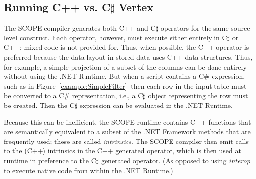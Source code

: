 \subsection{Running C++ vs. C$\sharp$ Vertex}
The SCOPE compiler generates both C++ and C$\sharp$ operators for the same source-level construct.
Each operator, however, must execute either entirely in C$\sharp$ or C++: mixed code is not provided for.
Thus, when possible, the C++ operator is preferred because the data layout in stored data uses C++ data structures.
Thus, for example, a simple projection of a subset of the columns can be done entirely
without using the .NET Runtime.
But when a script contains a C\# expression, such as in Figure~\ref{example:SimpleFilter}, then
each row in the input table must be converted to a C\# representation, i.e., a C$\sharp$ object representing
the row must be created.
Then the C$\sharp$ expression can be evaluated in the .NET Runtime.

Because this can be inefficient, the SCOPE runtime contains C++ functions that are semantically
equivalent to a subset of the .NET Framework methods that are frequently used; these are called
{\it intrinsics}.
The SCOPE compiler then emit calls to the (C++) intrinsics in the C++ generated operator, which is
then used at runtime in preference to the C$\sharp$ generated operator.
(As opposed to using {\it interop} to execute native code from within the .NET Runtime.)


